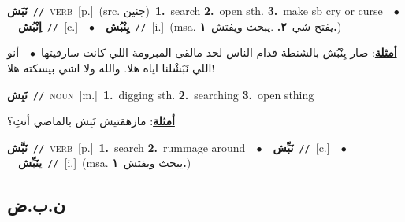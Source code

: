 \documentclass[10pt,a4paper,twoside]{article} %
\begin{document}
\begin{multicols}{2}
{\setlength\topsep{0pt}\textbf{\foreignlanguage{arabic}{نَبَش}}\ {\color{gray}\texttt{//}\color{black}}\ \textsc{verb}\ [p.]\ (src. \color{gray}\foreignlanguage{arabic}{جنين}\color{black})\ \textbf{1.}~search  \textbf{2.}~open sth.  \textbf{3.}~make sb cry or curse\ \ $\bullet$\ \ \setlength\topsep{0pt}\textbf{\foreignlanguage{arabic}{اِنْبُش}}\ {\color{gray}\texttt{//}\color{black}}\ [c.]\ \ $\bullet$\ \ \setlength\topsep{0pt}\textbf{\foreignlanguage{arabic}{يِنْبُش}}\ {\color{gray}\texttt{//}\color{black}}\ [i.]\ \color{gray}(msa. \foreignlanguage{arabic}{يفتح شي}~\foreignlanguage{arabic}{\textbf{٢.}}  .\foreignlanguage{arabic}{يبحث ويفتش}~\foreignlanguage{arabic}{\textbf{١.}})\color{black}\  \begin{flushright}\color{gray}\foreignlanguage{arabic}{\textbf{\underline{\foreignlanguage{arabic}{أمثلة}}}: صار يِنْبُش بالشنطة قدام الناس لحد مالقى المبرومة اللي كانت سارقيتها\ $\bullet$\ \  أنو اللي نَبَشْلنا اياه هلا. والله ولا اشي بيسكته هلا!}\end{flushright}\color{black}} \vspace{2mm}

{\setlength\topsep{0pt}\textbf{\foreignlanguage{arabic}{نَبِش}}\ {\color{gray}\texttt{//}\color{black}}\ \textsc{noun}\ [m.]\ \textbf{1.}~digging sth.  \textbf{2.}~searching  \textbf{3.}~open sthing\  \begin{flushright}\color{gray}\foreignlanguage{arabic}{\textbf{\underline{\foreignlanguage{arabic}{أمثلة}}}: مازهقتيش نَبِش بالماضي أنتِ؟}\end{flushright}\color{black}} \vspace{2mm}

{\setlength\topsep{0pt}\textbf{\foreignlanguage{arabic}{نَبَّش}}\ {\color{gray}\texttt{//}\color{black}}\ \textsc{verb}\ [p.]\ \textbf{1.}~search  \textbf{2.}~rummage around\ \ $\bullet$\ \ \setlength\topsep{0pt}\textbf{\foreignlanguage{arabic}{نَبِّش}}\ {\color{gray}\texttt{//}\color{black}}\ [c.]\ \ $\bullet$\ \ \setlength\topsep{0pt}\textbf{\foreignlanguage{arabic}{ينَبِّش}}\ {\color{gray}\texttt{//}\color{black}}\ [i.]\ \color{gray}(msa. \foreignlanguage{arabic}{يبحث ويفتش}~\foreignlanguage{arabic}{\textbf{١.}})\color{black}\ } \vspace{2mm}

\vspace{-3mm}
\subsection*{\color{blue}\foreignlanguage{arabic}{ن.ب.ض}\color{blue}{}} 


\end{multicols}
\end{document}
